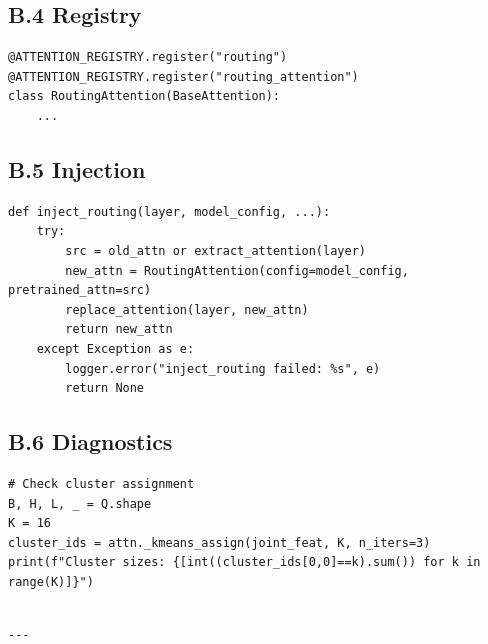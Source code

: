 \subsection{B.4 Registry}

\begin{lstlisting}
@ATTENTION_REGISTRY.register("routing")
@ATTENTION_REGISTRY.register("routing_attention")
class RoutingAttention(BaseAttention):
    ...
\end{lstlisting}

\subsection{B.5 Injection}

\begin{lstlisting}
def inject_routing(layer, model_config, ...):
    try:
        src = old_attn or extract_attention(layer)
        new_attn = RoutingAttention(config=model_config, pretrained_attn=src)
        replace_attention(layer, new_attn)
        return new_attn
    except Exception as e:
        logger.error("inject_routing failed: %s", e)
        return None
\end{lstlisting}

\subsection{B.6 Diagnostics}

\begin{lstlisting}
# Check cluster assignment
B, H, L, _ = Q.shape
K = 16
cluster_ids = attn._kmeans_assign(joint_feat, K, n_iters=3)
print(f"Cluster sizes: {[int((cluster_ids[0,0]==k).sum()) for k in range(K)]}")
\end{lstlisting}
\begin{lstlisting}

---
\end{lstlisting}